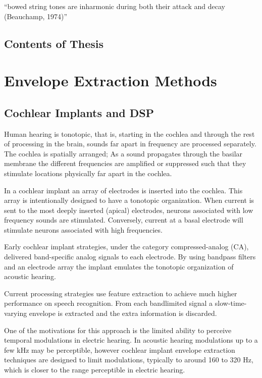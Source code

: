 \documentclass [11pt, proquest] {uwthesis}[2015/03/03]
\begin{document}
``bowed string tones are inharmonic during both their attack and decay (Beauchamp, 1974)''

\section{Contents of Thesis}


\chapter{Envelope Extraction Methods}

\section{Cochlear Implants and DSP}

Human hearing is tonotopic, that is, starting in the cochlea and through the rest of processing in the brain, sounds far apart in frequency are processed separately.  The cochlea is spatially arranged; As a sound propagates through the basilar membrane the different frequencies are amplified or suppressed such that they stimulate locations physically far apart in the cochlea.

In a cochlear implant an array of electrodes is inserted into the cochlea.  This array is intentionally designed to have a tonotopic organization.  When current is sent to the most deeply inserted (apical) electrodes, neurons associated with low frequency sounds are stimulated.  Conversely, current at a basal electrode will stimulate neurons associated with high frequencies.

Early cochlear implant strategies, under the category compressed-analog (CA), delivered band-specific analog signals to each electrode.  By using bandpass filters and an electrode array the implant emulates the tonotopic organization of acoustic hearing.

Current processing strategies use feature extraction to achieve much higher performance on speech recognition.  From each bandlimited signal a slow-time-varying envelope is extracted and the extra information is discarded.

One of the motivations for this approach is the limited ability to perceive temporal modulations in electric hearing.  In acoustic hearing modulations up to a few kHz may be perceptible, however cochlear implant envelope extraction techniques are designed to limit modulations, typically to around 160 to 320 Hz, which is closer to the range perceptible in electric hearing.
\end{document}
